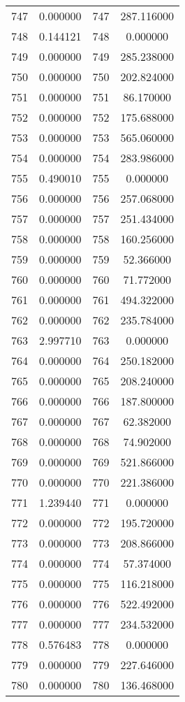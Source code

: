 \documentclass[12pt]{article}
\begin{document}
\begin{longtable}{@{}cccc@{}}
747 & 0.000000 & 747 & 287.116000 \\
748 & 0.144121 & 748 & 0.000000 \\
749 & 0.000000 & 749 & 285.238000 \\
750 & 0.000000 & 750 & 202.824000 \\
751 & 0.000000 & 751 & 86.170000 \\
752 & 0.000000 & 752 & 175.688000 \\
753 & 0.000000 & 753 & 565.060000 \\
754 & 0.000000 & 754 & 283.986000 \\
755 & 0.490010 & 755 & 0.000000 \\
756 & 0.000000 & 756 & 257.068000 \\
757 & 0.000000 & 757 & 251.434000 \\
758 & 0.000000 & 758 & 160.256000 \\
759 & 0.000000 & 759 & 52.366000 \\
760 & 0.000000 & 760 & 71.772000 \\
761 & 0.000000 & 761 & 494.322000 \\
762 & 0.000000 & 762 & 235.784000 \\
763 & 2.997710 & 763 & 0.000000 \\
764 & 0.000000 & 764 & 250.182000 \\
765 & 0.000000 & 765 & 208.240000 \\
766 & 0.000000 & 766 & 187.800000 \\
767 & 0.000000 & 767 & 62.382000 \\
768 & 0.000000 & 768 & 74.902000 \\
769 & 0.000000 & 769 & 521.866000 \\
770 & 0.000000 & 770 & 221.386000 \\
771 & 1.239440 & 771 & 0.000000 \\
772 & 0.000000 & 772 & 195.720000 \\
773 & 0.000000 & 773 & 208.866000 \\
774 & 0.000000 & 774 & 57.374000 \\
775 & 0.000000 & 775 & 116.218000 \\
776 & 0.000000 & 776 & 522.492000 \\
777 & 0.000000 & 777 & 234.532000 \\
778 & 0.576483 & 778 & 0.000000 \\
779 & 0.000000 & 779 & 227.646000 \\
780 & 0.000000 & 780 & 136.468000 \\

\end{longtable}
\end{document}
